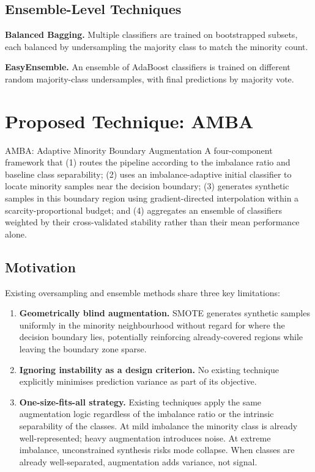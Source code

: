 \documentclass[11pt,a4paper]{article}
\begin{document}
\subsection{Ensemble-Level Techniques}

\textbf{Balanced Bagging.} Multiple classifiers are trained on bootstrapped subsets, each
balanced by undersampling the majority class to match the minority count.

\textbf{EasyEnsemble.} An ensemble of AdaBoost classifiers is trained on different random
majority-class undersamples, with final predictions by majority vote.

\section{Proposed Technique: AMBA}

\begin{framebox}{AMBA: Adaptive Minority Boundary Augmentation}
A four-component framework that (1) routes the pipeline according to the imbalance ratio
and baseline class separability; (2) uses an imbalance-adaptive initial classifier to locate
minority samples near the decision boundary; (3) generates synthetic samples in this boundary
region using gradient-directed interpolation within a scarcity-proportional budget; and (4)
aggregates an ensemble of classifiers weighted by their cross-validated stability rather than
their mean performance alone.
\end{framebox}

\subsection{Motivation}

Existing oversampling and ensemble methods share three key limitations:

\begin{enumerate}
  \item \textbf{Geometrically blind augmentation.} SMOTE generates synthetic samples
        uniformly in the minority neighbourhood without regard for where the decision boundary
        lies, potentially reinforcing already-covered regions while leaving the boundary zone
        sparse.
  \item \textbf{Ignoring instability as a design criterion.} No existing technique explicitly
        minimises prediction variance as part of its objective.
  \item \textbf{One-size-fits-all strategy.} Existing techniques apply the same augmentation
        logic regardless of the imbalance ratio or the intrinsic separability of the classes.
        At mild imbalance the minority class is already well-represented; heavy augmentation
        introduces noise. At extreme imbalance, unconstrained synthesis risks mode collapse.
        When classes are already well-separated, augmentation adds variance, not signal.
\end{enumerate}
\end{document}
